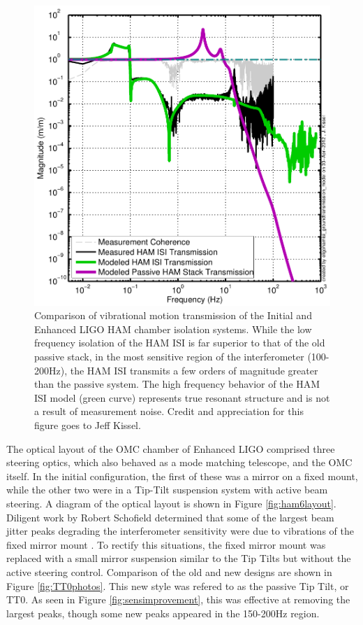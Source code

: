 \begin{figure}
  \begin{center}
  \leavevmode
  \includegraphics{figs-jitter/hamtransmission.pdf}
  \end{center}
  \caption[Comparison of vibrational motion transmission of the Initial and Enhanced LIGO HAM chamber isolation systems.]{Comparison of vibrational motion transmission of the Initial and Enhanced LIGO HAM chamber isolation systems. While the low frequency isolation of the HAM ISI is far superior to that of the old passive stack, in the most sensitive region of the interferometer (100-200Hz), the HAM ISI transmits a few orders of magnitude greater than the passive system. The high frequency behavior of the HAM ISI model (green curve) represents true resonant structure and is not a result of measurement noise. Credit and appreciation for this figure goes to Jeff Kissel.}
  \label{fig:hamtransmission}
\end{figure}

The optical layout of the OMC chamber of Enhanced LIGO comprised three steering optics, which also behaved as a mode matching telescope, and the OMC itself. %
In the initial configuration, the first of these was a mirror on a fixed mount, while the other two were in a Tip-Tilt suspension system with active beam steering. %
A diagram of the optical layout is shown in Figure \ref{fig:ham6layout}. %
Diligent work by Robert Schofield determined that some of the largest beam jitter peaks degrading the interferometer sensitivity were due to vibrations of the fixed mirror mount \cite{fixedmountpeaks}. %
To rectify this situations, the fixed mirror mount was replaced with a small mirror suspension similar to the Tip Tilts but without the active steering control. %
Comparison of the old and new designs are shown in Figure \ref{fig:TT0photos}. %
This new style was refered to as the passive Tip Tilt, or TT0. %
As seen in Figure \ref{fig:sensimprovement}, this was effective at removing the largest peaks, though some new peaks appeared in the 150-200Hz region.

